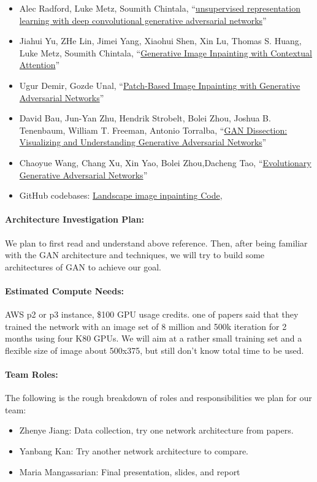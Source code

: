 \documentclass[11pt]{article}
\begin{document}
\begin{itemize} 
\item Alec Radford, Luke Metz, Soumith Chintala, ``\href{https://arxiv.org/pdf/1511.06434.pdf}{unsupervised representation learning with deep convolutional generative adversarial networks}'' 
\item Jiahui Yu, ZHe Lin, Jimei Yang, Xiaohui Shen, Xin Lu, Thomas S. Huang, Luke Metz, Soumith Chintala, ``\href{http://openaccess.thecvf.com/content_cvpr_2018/papers/Yu_Generative_Image_Inpainting_CVPR_2018_paper.pdf}{Generative Image Inpainting with Contextual Attention}'' 
\item Ugur Demir, Gozde Unal, ``\href{https://arxiv.org/pdf/1803.07422.pdf}{Patch-Based Image Inpainting with Generative Adversarial Networks}'' 
\item David Bau, Jun-Yan Zhu, Hendrik Strobelt, Bolei Zhou, Joshua B. Tenenbaum, William T. Freeman, Antonio Torralba, ``\href{https://arxiv.org/pdf/1811.10597.pdf}{GAN Dissection: Visualizing and Understanding Generative Adversarial Networks}'' 
\item Chaoyue Wang,  Chang Xu, Xin Yao, Bolei Zhou,Dacheng Tao, ``\href{https://arxiv.org/pdf/1803.00657.pdf}{Evolutionary Generative Adversarial Networks}'' 

\item GitHub codebases: \href{https://github.com/tron32213021/ee599-GAN-Project} {Landscape image inpainting Code},  
\end{itemize} 


\paragraph{Architecture Investigation Plan:}  We plan to first read and understand above reference. Then, after being familiar with the GAN architecture and techniques, we will try to build some architectures of GAN to achieve our goal.

\paragraph{Estimated Compute Needs:}  AWS p2 or p3 instance, \$100 GPU usage credits. one of papers said that they trained the network with an image set of 8 million and 500k iteration for 2 months using four K80 GPUs. We will aim at a rather small training set and a flexible size of image about 500x375, but still don't know total time to be used. 

\paragraph{Team Roles:} The following is the rough breakdown of roles and responsibilities we plan for our team:
\begin{itemize}
\item Zhenye Jiang: Data collection, try one network architecture from papers.
\item Yanbang Kan: Try another network architecture to compare.
\item Maria Mangassarian: Final presentation, slides, and report
\end{itemize}
\end{document}
